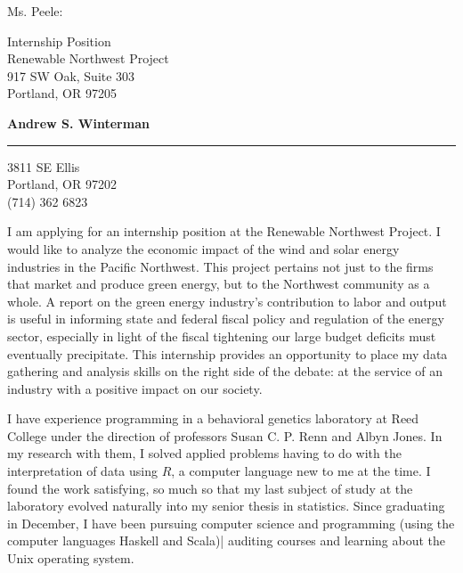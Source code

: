 \documentclass[11pt]{letter} %
\begin{document}
\longindentation=0pt                       %
\let\raggedleft\raggedright                %
 
\opening{Ms. Peele:} 


\begin{letter}{
Internship Position\\
Renewable Northwest Project \\
917 SW Oak,
Suite 303 \\
Portland, OR 97205 \\ }

\begin{center}
\large \bf{Andrew S. Winterman} \end{center}
\medskip\hrule height 1pt
\begin{center}
3811 SE Ellis \\ Portland, OR 97202 \\ (714) 362 6823
\end{center}  




I am applying for an internship position at %
the Renewable Northwest Project.  I would like to analyze the economic
impact of the wind and solar energy industries in the Pacific
Northwest. This project pertains not just to the firms that
market and produce green energy, but to the Northwest community as a
whole. A report on the green energy industry's contribution to labor
and output is useful in informing state and federal fiscal policy and
regulation of the energy sector, especially in light of the fiscal
tightening our large budget deficits must eventually precipitate. This
internship provides an opportunity to place my data gathering and
analysis skills on the right side of the debate: at the service of an
industry with a positive impact on our society.
 
I have experience programming in a behavioral genetics laboratory at
Reed College under the direction of professors Susan C. P. Renn and
Albyn Jones. In my research with them, I solved applied problems
having to do with the interpretation of data using $R$, a computer
language new to me at the time. I found the work satisfying, so much
so that my last subject of study at the laboratory evolved naturally
into my senior thesis in statistics. Since graduating in December, I
have been pursuing computer science and programming (using  the
computer languages Haskell and Scala)| auditing courses and learning
about the Unix operating system.
 

\end{letter}
\end{document}
